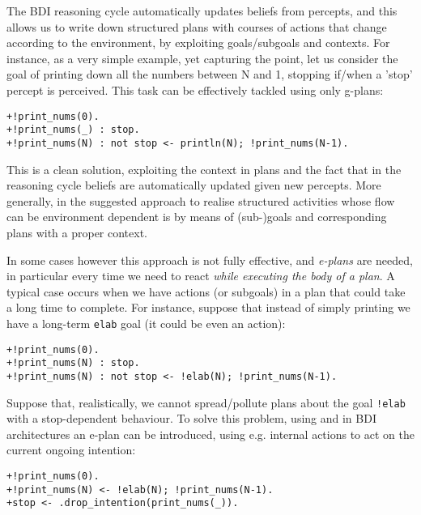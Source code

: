 The BDI reasoning cycle automatically updates beliefs from percepts,
and this allows us to write down structured plans with courses of
actions that change according to the environment, by exploiting
goals/subgoals and contexts.
%
For instance, as a very simple example, yet capturing the point, let
us consider the goal of printing down all the numbers between N and 1,
stopping if/when a 'stop' percept is perceived.
%
This task can be effectively tackled using only g-plans:

\begin{small}
\begin{verbatim}
+!print_nums(0).
+!print_nums(_) : stop.
+!print_nums(N) : not stop <- println(N); !print_nums(N-1).
\end{verbatim}
\end{small}
	
\noindent This is a clean solution, exploiting the context in plans
and the fact that in the reasoning cycle beliefs are automatically
updated given new percepts.
%
More generally, in {\asl} the suggested approach to realise
structured activities whose flow can be environment dependent is by
means of (sub-)goals and corresponding plans with a proper context.

In some cases however this approach is not fully effective, and
\emph{e-plans} are needed,
%
in particular every time we need to react \emph{while executing the
  body of a plan}.
%
A typical case occurs when we have actions (or subgoals) in a plan
that could take a long time to complete.
%
For instance, suppose that instead of simply printing we have a
long-term \texttt{elab} goal (it could be even an action):

\begin{small}
\begin{verbatim}
+!print_nums(0).
+!print_nums(N) : stop. 
+!print_nums(N) : not stop <- !elab(N); !print_nums(N-1).
\end{verbatim}
\end{small}

\noindent Suppose that, realistically, we cannot spread/pollute plans
about the goal \texttt{!elab} with a stop-dependent behaviour.
%
To solve this problem, using {\asl} and in BDI architectures
an e-plan can be introduced, using e.g. internal actions to act on the
current ongoing intention:

\begin{small}
\begin{verbatim}
+!print_nums(0).
+!print_nums(N) <- !elab(N); !print_nums(N-1).		
+stop <- .drop_intention(print_nums(_)).
\end{verbatim}
\end{small}

